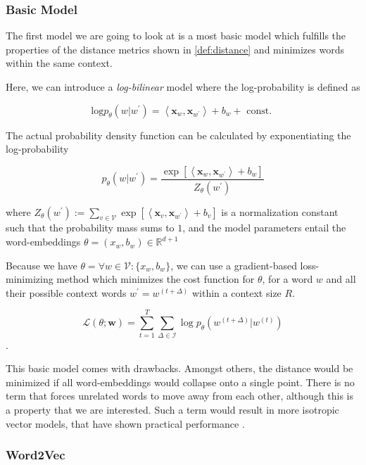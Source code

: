 \documentclass[a4paper,12pt,oneside,openright]{report}
\begin{document}
\subsubsection{Basic Model}

The first model we are going to look at is a most basic model which fulfills the properties of the distance metrics shown in \eqref{def:distance} and minimizes words within the same context.

Here, we can introduce a \textit{log-bilinear} \cite{cil_slides} model where the log-probability is defined as

\begin{equation}
\text{log} p_{\theta}(w | w^{\prime}) = \left\langle\mathbf{x}_{w}, \mathbf{x}_{w^{\prime}}\right\rangle+b_{w} + \text { const. }
\end{equation}

The actual probability density function can be calculated by exponentiating the log-probability

$$
p_{\theta}\left(w | w^{\prime}\right)=\frac{\exp \left[\left\langle\mathbf{x}_{w}, \mathbf{x}_{w^{\prime}}\right\rangle+b_{w}\right]}{Z_{\theta}\left(w^{\prime}\right)}
$$

where $Z_{\theta}\left(w^{\prime}\right):=\sum_{v \in \mathcal{V}} \exp \left[\left\langle\mathbf{x}_{v}, \mathbf{x}_{w^{\prime}}\right\rangle+b_{v}\right]$ is a normalization constant such that the probability mass sums to $1$, and the model parameters entail the word-embeddings $\theta = (x_w, b_w) \in \mathbb{R}^{d+1}$

Because we have $\theta = \forall w \in \mathcal{V} : \{ x_w, b_w \}$, we can use a gradient-based loss-minimizing method which minimizes the cost function for $\theta$, for a word $w$ and all their possible context words $w^{\prime} = w^{(t+\Delta)}$ within a context size $R$.

$$
\mathcal{L}(\theta ; \mathbf{w})=\sum_{t=1}^{T} \sum_{\Delta \in \mathcal{I}} \log p_{\theta}\left(w^{(t+\Delta)} | w^{(t)}\right)
$$.

This basic model comes with drawbacks. 
Amongst others, the distance would be minimized if all word-embeddings would collapse onto a single point. 
There is no term that forces unrelated words to move away from each other, although this is a property that we are interested.
Such a term would result in more isotropic vector models, that have shown practical performance \cite{ethayarajh19}.


\subsubsection{Word2Vec}
\end{document}
